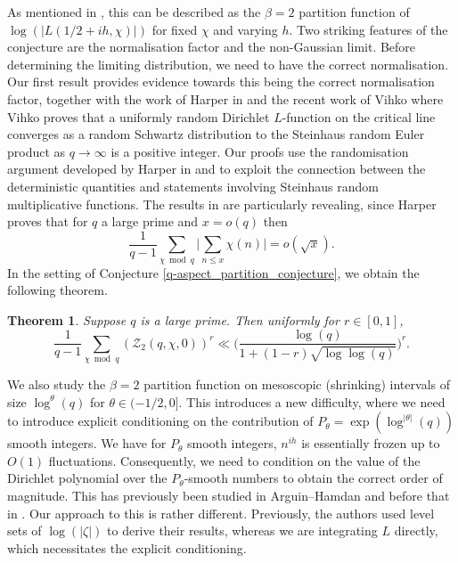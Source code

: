 \documentclass[reqno]{amsart}
\newtheorem{theorem}{Theorem}
\theoremstyle{definition}
\theoremstyle{remark}
\numberwithin{equation}{section}
\theoremstyle{remark}
\begin{document}
As mentioned in \cite{harper2019partition}, this can be described as the $\beta=2$ partition function of $\log(|L(1/2+ih,\chi)|)$ for fixed $\chi$ and varying $h$. Two striking features of the conjecture are the normalisation factor and the non-Gaussian limit. Before determining the limiting distribution, we need to have the correct normalisation. Our first result provides evidence towards this being the correct normalisation factor, together with the work of Harper in \cite{harper2023typicalsizecharacterzeta} and the recent work of Vihko \cite{vihko2025dirichlet} where Vihko proves that a uniformly random Dirichlet $L$-function on the critical line converges as a random Schwartz distribution to the Steinhaus random Euler product as $q \to \infty$ is a positive integer. Our proofs use the randomisation argument developed by Harper in \cite{harper2019partition} and \cite{harper2023typicalsizecharacterzeta} to exploit the connection between the deterministic quantities and statements involving Steinhaus random multiplicative functions. The results in \cite{harper2023typicalsizecharacterzeta} are particularly revealing, since Harper proves that for $q$ a large prime and $x=o(q)$ then
$$\frac{1}{q-1}\sum_{\chi \bmod{q}}\big|\sum_{n \leq x}\chi(n)\big| = o(\sqrt{x}).$$
In the setting of Conjecture \ref{q-aspect_partition_conjecture}, we obtain the following theorem.
\begin{theorem}
Suppose $q$ is a large prime. Then uniformly for $r \in [0,1]$,
    $$\frac{1}{q-1}\sum_{\chi \bmod{q}}(\mathcal{Z}_2(q,\chi,0))^r \ll \big(\frac{\log(q)}{1+(1-r)\sqrt{\log\log(q)}}\big)^r.$$
    \label{pf_moments_constant}
\end{theorem}
We also study the $\beta=2$ partition function on mesoscopic (shrinking) intervals of size $\log^{\theta}(q)$ for $\theta \in (-1/2,0]$. This introduces a new difficulty, where we need to introduce explicit conditioning on the contribution of $P_\theta = \exp(\log^{|\theta|}(q))$ smooth integers. We have for $P_\theta$ smooth integers, $n^{ih}$ is essentially frozen up to $O(1)$ fluctuations. Consequently, we need to condition on the value of the Dirichlet polynomial over the $P_\theta$-smooth numbers to obtain the correct order of magnitude. This has previously been studied in Arguin--Hamdan \cite{ah24} and before that in \cite{aor21}. Our approach to this is rather different. Previously, the authors used level sets of $\log(|\zeta|)$ to derive their results, whereas we are integrating $L$ directly, which necessitates the explicit conditioning. \par
\end{document}
